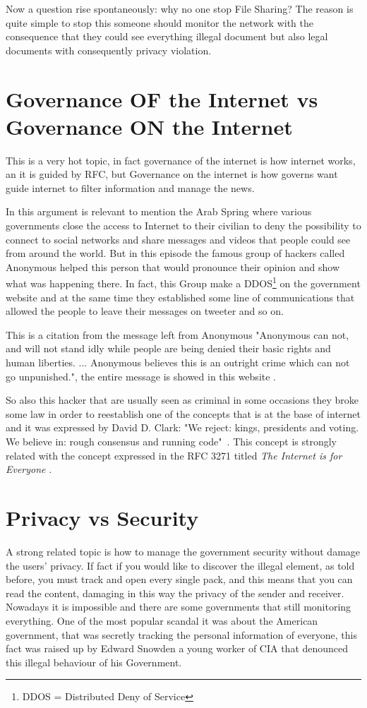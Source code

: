 \documentclass{article}
\begin{document}
    Now a question rise spontaneously: why no one stop File Sharing? The reason is quite simple to stop this someone should monitor the network with the consequence that they could see everything illegal document but also legal documents with consequently privacy violation.
    
\section{Governance OF the Internet vs Governance ON the Internet}
    This is a very hot topic, in fact governance of the internet is how internet works, an it is guided by RFC, but Governance on the internet is how governs want guide internet to filter information and manage the news.
    
    In this argument is relevant to mention the Arab Spring where various governments close the access to Internet to their civilian to deny the possibility to connect to social networks and share messages and videos that people could see from around the world. But in this episode the famous group of hackers called Anonymous helped this person that would pronounce their opinion and show what was happening there. In fact, this Group make a DDOS\footnote{DDOS = Distributed Deny of Service} on the government website and at the same time they established some line of communications that allowed the people to leave their messages on tweeter and so on.
    
    This is a citation from the message left from Anonymous "Anonymous can not, and will not stand idly while people are being denied their basic rights and human liberties. ... Anonymous believes this is an outright crime which can not go unpunished.", the entire message is showed in this website \cite{AnonymousEgypt}.
    
    So also this hacker that are usually seen as criminal in some occasions they broke some law in order to reestablish one of the concepts that is at the base of internet and it was expressed by David D. Clark: "We reject: kings, presidents and voting. We believe in: rough consensus and running code"~\cite{DavidC}.
    This concept is strongly related with the concept expressed in the RFC 3271 titled  \textit{The Internet is for Everyone} \cite{Cerf:2002:IE:RFC3271}.
    
\section{Privacy vs Security}
    A strong related topic is how to manage the government security without damage the users' privacy. If fact if you would like to discover the illegal element, as told before, you must track and open every single pack, and this means that you can read the content, damaging in this way the privacy of the sender and receiver.
    Nowadays it is impossible and there are some governments that still monitoring everything. One of the most popular scandal it was about the American government, that was secretly tracking the personal information of everyone, this fact was raised up by Edward Snowden \cite{snowden} a young worker of CIA that denounced this illegal behaviour of his Government. 
    
\end{document}
